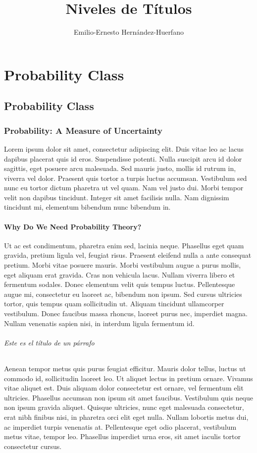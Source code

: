 \documentclass[11pt,letterpaper]{book}
\title{Niveles de Títulos}
\author{Emilio-Ernesto Hernández-Huerfano}
\begin{document}
\maketitle

\tableofcontents

\part{Probability Class}

\chapter{Probability Class}

\section{Probability: A Measure of Uncertainty}
\noindent Lorem ipsum dolor sit amet, consectetur adipiscing elit. Duis vitae leo ac lacus dapibus placerat quis id eros. Suspendisse potenti. Nulla suscipit arcu id dolor sagittis, eget posuere arcu malesuada. Sed mauris justo, mollis id rutrum in, viverra vel dolor. Praesent quis tortor a turpis luctus accumsan. Vestibulum sed nunc eu tortor dictum pharetra ut vel quam. Nam vel justo dui. Morbi tempor velit non dapibus tincidunt. Integer sit amet facilisis nulla. Nam dignissim tincidunt mi, elementum bibendum nunc bibendum in.

\subsection{Why Do We Need Probability Theory?}
\noindent Ut ac est condimentum, pharetra enim sed, lacinia neque. Phasellus eget quam gravida, pretium ligula vel, feugiat risus. Praesent eleifend nulla a ante consequat pretium. Morbi vitae posuere mauris. Morbi vestibulum augue a purus mollis, eget aliquam erat gravida. Cras non vehicula lacus. Nullam viverra libero et fermentum sodales. Donec elementum velit quis tempus luctus. Pellentesque augue mi, consectetur eu laoreet ac, bibendum non ipsum. Sed cursus ultricies tortor, quis tempus quam sollicitudin ut. Aliquam tincidunt ullamcorper vestibulum. Donec faucibus massa rhoncus, laoreet purus nec, imperdiet magna. Nullam venenatis sapien nisi, in interdum ligula fermentum id.

\paragraph{Este es el título de un párrafo} Aenean tempor metus quis purus feugiat efficitur. Mauris dolor tellus, luctus ut commodo id, sollicitudin laoreet leo. Ut aliquet lectus in pretium ornare. Vivamus vitae aliquet est. Duis aliquam dolor consectetur est ornare, vel fermentum elit ultricies. Phasellus accumsan non ipsum sit amet faucibus. Vestibulum quis neque non ipsum gravida aliquet. Quisque ultricies, nunc eget malesuada consectetur, erat nibh finibus nisi, in pharetra orci elit eget nulla. Nullam lobortis metus dui, ac imperdiet turpis venenatis at. Pellentesque eget odio placerat, vestibulum metus vitae, tempor leo. Phasellus imperdiet urna eros, sit amet iaculis tortor consectetur cursus. 
\end{document}
